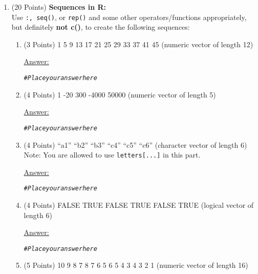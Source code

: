 \documentclass[12pt,letterpaper,final]{article}\usepackage[]{graphicx}\usepackage[]{xcolor}
\makeatletter
\newcommand{\hlcom}[1]{\textcolor[rgb]{0.678,0.584,0.686}{\textit{#1}}}%
\newenvironment{kframe}{%
 \def\at@end@of@kframe{}%
 \ifinner\ifhmode%
  \def\at@end@of@kframe{\end{minipage}}%
  \begin{minipage}{\columnwidth}%
 \fi\fi%
 \def\FrameCommand##1{\hskip\@totalleftmargin \hskip-\fboxsep
 \colorbox{shadecolor}{##1}\hskip-\fboxsep
     \hskip-\linewidth \hskip-\@totalleftmargin \hskip\columnwidth}%
 \MakeFramed {\advance\hsize-\width
   \@totalleftmargin\z@ \linewidth\hsize
   \@setminipage}}%
 {\par\unskip\endMakeFramed%
 \at@end@of@kframe}
\makeatother
\begin{document}
\begin{enumerate}

\item (20 Points) {\bf Sequences in R:} \\
Use {\tt :, seq()}, or {\tt rep()} and some other operators/functions appropriately, 
but definitely {\bf not c()}, to create the following sequences:

\begin{enumerate}
\item (3 Points)
1  5  9 13 17 21 25 29 33 37 41 45 (numeric vector of length 12)

\underline{Answer:}
\begin{kframe}
\begin{alltt}
\hlcom{# Place your answer here}
\end{alltt}
\end{kframe}


\item (4 Points)
1   -20   300 -4000 50000 (numeric vector of length 5)

\underline{Answer:}
\begin{kframe}
\begin{alltt}
\hlcom{# Place your answer here}
\end{alltt}
\end{kframe}


\item (4 Points)
``a1'' ``b2'' ``b3'' ``c4'' ``c5'' ``c6'' (character vector of length 6) \\
Note: You are allowed to use \verb|letters[...]| in this part.

\underline{Answer:}
\begin{kframe}
\begin{alltt}
\hlcom{# Place your answer here}
\end{alltt}
\end{kframe}


\item (4 Points)
FALSE TRUE FALSE TRUE FALSE TRUE (logical vector of length 6)

\underline{Answer:}
\begin{kframe}
\begin{alltt}
\hlcom{# Place your answer here}
\end{alltt}
\end{kframe}


\item (5 Points)
 10  9  8  7  8  7  6  5  6  5  4  3  4  3  2  1 (numeric vector of length 16)


\end{enumerate}
\end{enumerate}
\end{document}
